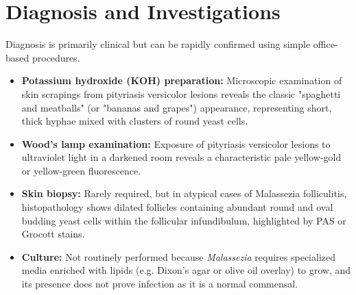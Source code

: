 \section*{Diagnosis and Investigations}
Diagnosis is primarily clinical but can be rapidly confirmed using simple office-based procedures.
\begin{itemize}
    \item \textbf{Potassium hydroxide (KOH) preparation:} Microscopic examination of skin scrapings from pityriasis versicolor lesions reveals the classic "spaghetti and meatballs" (or "bananas and grapes") appearance, representing short, thick hyphae mixed with clusters of round yeast cells.
    \item \textbf{Wood's lamp examination:} Exposure of pityriasis versicolor lesions to ultraviolet light in a darkened room reveals a characteristic pale yellow-gold or yellow-green fluorescence.
    \item \textbf{Skin biopsy:} Rarely required, but in atypical cases of Malassezia folliculitis, histopathology shows dilated follicles containing abundant round and oval budding yeast cells within the follicular infundibulum, highlighted by PAS or Grocott stains.
    \item \textbf{Culture:} Not routinely performed because \textit{Malassezia} requires specialized media enriched with lipids (e.g. Dixon's agar or olive oil overlay) to grow, and its presence does not prove infection as it is a normal commensal.
\end{itemize}

